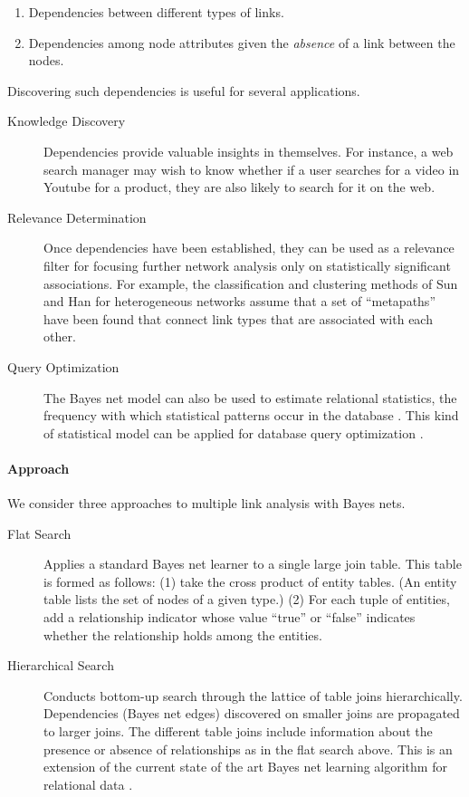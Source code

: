 \documentclass[runningheads,a4paper]{llncs}
\begin{document}
\begin{enumerate}
\item Dependencies between  different types of links.
\item Dependencies among node attributes given the {\em absence} of a link between the nodes.
\end{enumerate}

Discovering such dependencies is useful for several applications. 

\begin{description}
\item[Knowledge Discovery] Dependencies provide valuable insights in themselves. For instance, a web search manager may wish to know whether if a user searches for a video in Youtube for a product, they are also likely to search for it on the web. 
\item[Relevance Determination] Once dependencies have been established, they can be used as a relevance filter for focusing further network analysis only on statistically significant associations. For example, the classification and clustering methods of Sun and Han \cite{Sun2012} for heterogeneous networks assume that a set of ``metapaths'' have been found that connect link types that are associated with each other. 
\item[Query Optimization] The Bayes net model can also be used to estimate relational statistics, the frequency with which statistical patterns occur in the database \cite{Schulte2012b}. This kind of statistical model can be applied for database query optimization \cite{Getoor2001}.
\end{description}

\paragraph{Approach}

We consider three approaches to multiple link analysis with Bayes nets. 

\begin{description}
\item[Flat Search] Applies a standard Bayes net learner to a single large join table. This table is formed as follows: (1) take the cross product of entity tables. (An entity table lists the set of nodes of a given type.) (2) For each tuple of entities, add a relationship indicator whose value ``true'' or ``false'' indicates whether the relationship holds among the entities. 
\item[Hierarchical Search] Conducts bottom-up  search
 through the lattice of table joins hierarchically. Dependencies (Bayes net edges) discovered on smaller joins are propagated to larger joins. 
The different table joins include information about the presence or absence of relationships as in the flat search above. 
This is an extension of the current state of the art Bayes net learning algorithm for relational data \cite{Schulte2012}.
\end{description}
\end{document}
